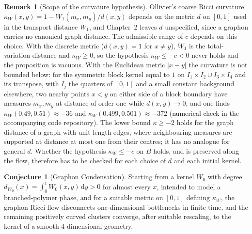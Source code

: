 \documentclass[11pt,a4paper,reqno]{amsart}
\theoremstyle{definition}
\newtheorem{remark}[theorem]{Remark}
\newtheorem{conjecture}[theorem]{Conjecture}
\numberwithin{equation}{section}
\newcommand{\dif}{\,\mathrm{d}}
\begin{document}
\begin{remark}[Scope of the curvature hypothesis]
Ollivier's coarse Ricci curvature $\kappa_W(x,y) = 1 - W_1(m_x, m_y)/d(x,y)$ depends on the metric $d$ on $[0,1]$ used in the transport distance $W_1$, and Chapter~2 leaves $d$ unspecified, since a graphon carries no canonical graph distance. The admissible range of $c$ depends on this choice. With the discrete metric ($d(x,y) = 1$ for $x \ne y$), $W_1$ is the total-variation distance and $\kappa_W \ge 0$, so the hypothesis $\kappa_W \le -c < 0$ never holds and the proposition is vacuous. With the Euclidean metric $|x - y|$ the curvature is not bounded below: for the symmetric block kernel equal to $1$ on $I_1 \times I_2 \cup I_3 \times I_4$ and its transpose, with $I_j$ the quarters of $[0,1]$ and a small constant background elsewhere, two nearby points $x < y$ on either side of a block boundary have measures $m_x, m_y$ at distance of order one while $d(x,y) \to 0$, and one finds $\kappa_W(0.49, 0.51) \approx -36$ and $\kappa_W(0.499, 0.501) \approx -372$ (numerical check in the accompanying code repository). The lower bound $\kappa \ge -2$ holds for the graph distance of a graph with unit-length edges, where neighbouring measures are supported at distance at most one from their centres; it has no analogue for general $d$. Whether the hypothesis $\kappa_W \le -c$ on $B$ holds, and is preserved along the flow, therefore has to be checked for each choice of $d$ and each initial kernel.
\end{remark}

\begin{conjecture}[Graphon Condensation]
Starting from a kernel $W_0$ with degree $d_{W_0}(x) = \int_0^1 W_0(x,y)\dif y > 0$ for almost every $x$, intended to model a branched-polymer phase, and for a suitable metric on $[0,1]$ defining $\kappa_W$, the graphon Ricci flow disconnects one-dimensional bottlenecks in finite time, and the remaining positively curved clusters converge, after suitable rescaling, to the kernel of a smooth $4$-dimensional geometry.
\end{conjecture}
\end{document}
